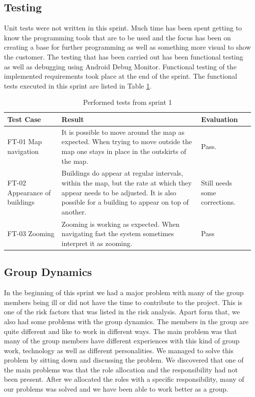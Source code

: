 \subsection{Testing}
	Unit tests were not written in this sprint. Much time has been spent getting to know 
	the programming tools that are to be used and the focus has been on creating a base for further 
	programming as well as something more visual to show the customer. The testing that has been 
	carried out has been functional testing as well as debugging using Android Debug Monitor. Functional 
	testing of the implemented requirements took place at the end of the sprint. The functional tests 
	executed in this sprint are listed in Table \ref{table:testsprint1}.


\begin{table}[H]
\begin{tabular}{| p{3cm} | p{7cm} | p{2cm} |}
	\hline
	\rowcolor{lightgray}
	{\bf Test Case} & {\bf Result} & {\bf Evaluation} \\ \hline
	FT-01 Map navigation & It is possible to move around the map as expected. When trying to move outside the map one stays in place in the outskirts of the map. & Pass. \\ \hline
  	FT-02 Appearance of buildings & Buildings do appear at regular intervals, within the map, but the rate at which they appear needs to be adjusted. It is also possible for a building to appear on top of another. & Still needs some corrections. \\ \hline
	FT-03 Zooming & Zooming is working as expected. When navigating fast the system sometimes interpret it as zooming. & Pass \\ \hline
\end{tabular}
\caption{Performed tests from sprint 1}
\label{table:testsprint1}
\end{table}

\subsection{Group Dynamics}
\label{subsec:groupdynamics}
	In the beginning of this sprint we had a major problem with many of the group members being ill or 
	did not have the time to contribute to the project. This is one of the risk factors 
	that was listed in the risk analysis. Apart form that, we also had some problems with the group dynamics. 
	The members in the group are quite different and like to work in different ways. The main problem was 
	that many of the group members have different experiences with this kind of group work, technology as well as 
	different personalities. We managed to solve this problem by sitting down and discussing the problem. We discovered that one of the main problems was that the role allocation and the responsibility had not 
	been present. After we allocated the roles with a specific responsibility, many of our problems was solved and
	we have been able to work better as a group.

